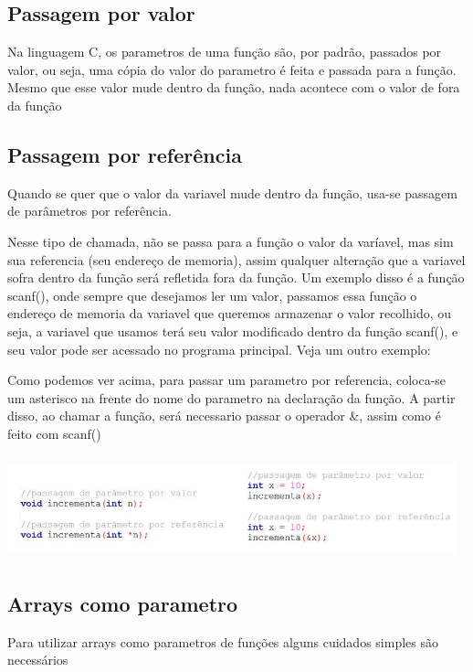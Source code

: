 \documentclass{report}
\begin{document}
	
	\subsection{Passagem por valor}
	Na linguagem C, os parametros de uma função são, por padrão, passados por valor, ou seja, uma cópia do valor do parametro é feita e passada para a função. Mesmo que esse valor mude dentro da função, nada acontece com o valor de fora da função
	\subsection{Passagem por referência}
	Quando se quer que o valor da variavel mude dentro da função, usa-se passagem de parâmetros por referência.
	
	Nesse tipo de chamada, não se passa para a função o valor da varíavel, mas sim sua referencia (seu endereço de memoria), assim qualquer alteração que a variavel sofra dentro da função será refletida fora da função. Um exemplo disso é a função scanf(), onde sempre que desejamos ler um valor, passamos essa função o endereço de memoria da variavel que queremos armazenar o valor recolhido, ou seja, a variavel que usamos terá seu valor modificado dentro da função scanf(), e seu valor pode ser acessado no programa principal. Veja um outro exemplo:
	
	Como podemos ver acima, para passar um parametro por referencia, coloca-se um asterisco na frente do nome do parametro na declaração da função. A partir disso, ao chamar a função, será necessario passar o operador \&, assim como é feito com scanf()
	
	\begin{center}
		
		\includegraphics[width=13cm,height=3cm,keepaspectratio=false]{imagens/referencia.png}
		
	\end{center}
	
	\subsection{Arrays como parametro}
	
	Para utilizar arrays como parametros de funções alguns cuidados simples são necessários
	
\end{document}
